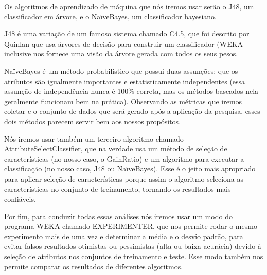 Os algoritmos de aprendizado de máquina que nós iremos usar serão o J48, um classificador em árvore, e o NaïveBayes, um classificador bayesiano.

J48 é uma variação de um famoso sistema chamado C4.5, que foi descrito por Quinlan \cite{Quinlan1993} que usa árvores de decisão para construir um classificador (WEKA inclusive nos fornece uma visão da árvore gerada com todos os seus pesos.

NaïveBayes é um método probabilístico que possui duas assunções: que os atributos são igualmente importantes e estatisticamente independentes (essa assunção de independência nunca é 100\% correta, mas os métodos baseados nela geralmente funcionam bem na prática). Observando as métricas que iremos coletar e o conjunto de dados que será gerado após a aplicação da pesquisa, esses dois métodos parecem servir bem aos nossos propósitos.

Nós iremos usar também um terceiro algoritmo chamado AttributeSelectClassifier, que na verdade usa um método de seleção de características (no nosso caso, o GainRatio) e um algoritmo para executar a classificação (no nosso caso, J48 ou NaïveBayes). Esse é o jeito mais apropriado para aplicar seleção de características porque assim o algoritmo seleciona as características no conjunto de treinamento, tornando os resultados mais confiáveis.

Por fim, para conduzir todas essas análises nós iremos usar um modo do programa WEKA chamado EXPERIMENTER, que nos permite rodar o mesmo experimento mais de uma vez e determinar a média e o desvio padrão, para evitar falsos resultados otimistas ou pessimistas (alta ou baixa acurácia) devido à seleção de atributos nos conjuntos de treinamento e teste. Esse modo também nos permite comparar os resultados de diferentes algoritmos.






















